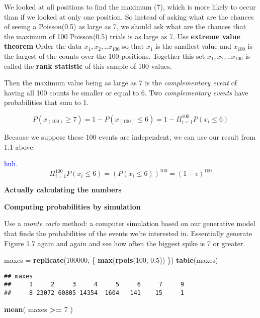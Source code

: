 \documentclass[]{article}
\newenvironment{Shaded}{\begin{snugshade}}{\end{snugshade}}
\newcommand{\KeywordTok}[1]{\textcolor[rgb]{0.13,0.29,0.53}{\textbf{#1}}}
\newcommand{\DecValTok}[1]{\textcolor[rgb]{0.00,0.00,0.81}{#1}}
\newcommand{\FloatTok}[1]{\textcolor[rgb]{0.00,0.00,0.81}{#1}}
\newcommand{\StringTok}[1]{\textcolor[rgb]{0.31,0.60,0.02}{#1}}
\newcommand{\OperatorTok}[1]{\textcolor[rgb]{0.81,0.36,0.00}{\textbf{#1}}}
\newcommand{\NormalTok}[1]{#1}
\begin{document}
We looked at all positions to find the maximum (7), which is more likely
to occur than if we looked at only one position. So instead of asking
what are the chances of seeing a Poisson(0.5) as large as 7, we should
ask what are the chances that the maximum of 100 Poisson(0.5) trials is
as large as 7. Use \textbf{extreme value theorem} Order the data
\(x_1, x_2, .. x_{100}\) so that \(x_{1}\) is the smallest value and
\(x_{100}\) is the largest of the counts over the 100 positions.
Together this set \(x_1, x_2, .. x_{100}\) is called the \textbf{rank
statistic} of this sample of 100 values.

Then the maximum value being as large as 7 is the \emph{complementary
event} of having all 100 counts be smaller or equal to 6. Two
\emph{complementary events} have probabilities that sum to 1.

\[P(x_{(100)}\geq 7)=1-P(x_{(100)} \leq 6)=1-
\Pi_{i=1}^{100} P(x_i \leq 6 )\]

Because we suppose these 100 events are independent, we can use our
result from 1.1 above:

\textcolor{blue}{huh.} \[
\Pi_{i=1}^{100} P(x_i \leq 6 ) = (P(x_i \leq 6))^{100} = (1- \epsilon)^{100}
\]

\textbf{Actually calculating the numbers}

\textbf{Computing probabilities by simulation}

Use a \emph{monte carlo} method: a computer simulation based on our
generative model that finds the probabilities of the events we're
interested in. Essentially generate Figure 1.7 again and again and see
how often the biggest spike is 7 or greater.

\begin{Shaded}
\begin{Highlighting}[]
\NormalTok{maxes =}\StringTok{ }\KeywordTok{replicate}\NormalTok{(}\DecValTok{100000}\NormalTok{, \{}
  \KeywordTok{max}\NormalTok{(}\KeywordTok{rpois}\NormalTok{(}\DecValTok{100}\NormalTok{, }\FloatTok{0.5}\NormalTok{))}
\NormalTok{\})}
\KeywordTok{table}\NormalTok{(maxes)}
\end{Highlighting}
\end{Shaded}

\begin{verbatim}
## maxes
##     1     2     3     4     5     6     7     9 
##     8 23072 60805 14354  1604   141    15     1
\end{verbatim}

\begin{Shaded}
\begin{Highlighting}[]
\KeywordTok{mean}\NormalTok{( maxes }\OperatorTok{>=}\StringTok{ }\DecValTok{7}\NormalTok{ )}
\end{Highlighting}
\end{Shaded}
\end{document}
